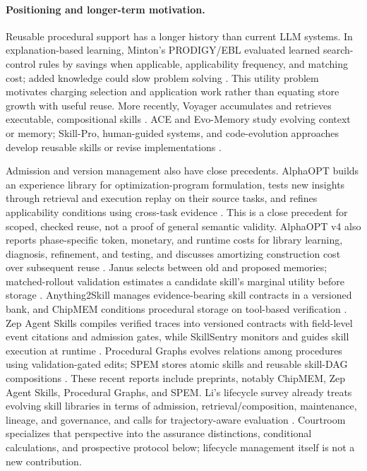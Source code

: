 \documentclass[10pt]{article} %
\providecommand{\1}{\mathbf{1}}  %
\theoremstyle{remark}
\theoremstyle{definition}
\begin{document}
\paragraph{Positioning and longer-term motivation.}

Reusable procedural support has a longer history than current LLM
systems. In explanation-based learning, Minton's PRODIGY/EBL evaluated
learned search-control rules by savings when applicable, applicability
frequency, and matching cost; added knowledge could slow problem solving
\citep[Sections~1 and~4.3]{minton1988utility}. This utility problem motivates
charging selection and application work rather than equating store growth
with useful reuse. More recently, Voyager accumulates and retrieves
executable, compositional skills \citep{wang2024voyager}.
ACE and Evo-Memory study evolving context or memory; Skill-Pro, human-guided
systems, and code-evolution approaches develop reusable skills or revise
implementations
\citep{ace2026,wei2025evomemory,mi2026skillpro,aria2025,darwingodel2026}.

Admission and version management also have close precedents. AlphaOPT
builds an experience library for optimization-program formulation, tests
new insights through retrieval and execution replay on their source tasks,
and refines applicability conditions using cross-task evidence
\citep{kong2026alphaopt}. This is a close precedent for scoped, checked
reuse, not a proof of general semantic validity. AlphaOPT v4 also reports
phase-specific token, monetary, and runtime costs for library learning,
diagnosis, refinement, and testing, and discusses amortizing construction
cost over subsequent reuse \citep[Appendix~B.4 and Table~5]{kong2026alphaopt}.
Janus selects
between old and proposed memories; matched-rollout validation estimates a
candidate skill's marginal utility before storage
\citep{chen2026janus,zhang2026coevolving}.
Anything2Skill manages evidence-bearing skill contracts in a versioned bank,
and ChipMEM conditions procedural storage on tool-based verification
\citep{pan2026anything2skill,alrabah2026chipmem}.
Zep Agent Skills compiles verified traces into versioned contracts with
field-level event citations and admission gates, while SkillSentry monitors
and guides skill execution at runtime
\citep{chalef2026learningbydoing,skillsentry2026}.
Procedural Graphs evolves relations among procedures using validation-gated
edits; SPEM stores atomic skills and reusable skill-DAG compositions
\citep{lu2026proceduralgraphs,zhou2026spem}.
These recent reports include preprints, notably ChipMEM, Zep Agent Skills,
Procedural Graphs, and SPEM. Li's lifecycle survey already treats evolving skill libraries in terms of
admission, retrieval/composition, maintenance, lineage, and governance,
and calls for trajectory-aware evaluation \citep{li2026dynamicskills}.
Courtroom specializes that perspective into the assurance distinctions,
conditional calculations, and prospective protocol below; lifecycle
management itself is not a new contribution.
\end{document}
